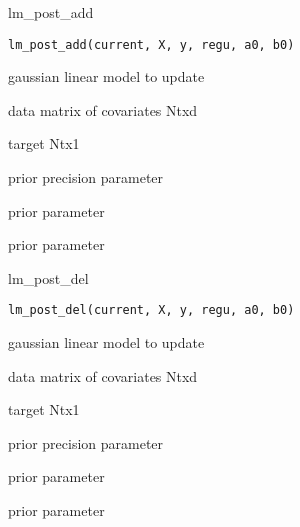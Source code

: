 \documentclass[letterpaper]{book}
\begin{document}
%
\begin{Description}\relax
lm\_post\_add
\end{Description}
%
\begin{Usage}
\begin{verbatim}
lm_post_add(current, X, y, regu, a0, b0)
\end{verbatim}
\end{Usage}
%
\begin{Arguments}
\begin{ldescription}
\item[\code{current}] gaussian linear model to update

\item[\code{X}] data matrix of covariates Ntxd

\item[\code{y}] target Ntx1

\item[\code{regu}] prior precision parameter

\item[\code{a0}] prior parameter

\item[\code{b0}] prior parameter
\end{ldescription}
\end{Arguments}
%
\begin{Description}\relax
lm\_post\_del
\end{Description}
%
\begin{Usage}
\begin{verbatim}
lm_post_del(current, X, y, regu, a0, b0)
\end{verbatim}
\end{Usage}
%
\begin{Arguments}
\begin{ldescription}
\item[\code{current}] gaussian linear model to update

\item[\code{X}] data matrix of covariates Ntxd

\item[\code{y}] target Ntx1

\item[\code{regu}] prior precision parameter

\item[\code{a0}] prior parameter

\item[\code{b0}] prior parameter
\end{ldescription}
\end{Arguments}
\end{document}
